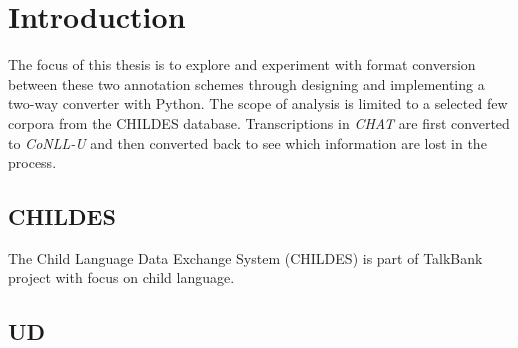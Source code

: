 \chapter{Introduction} %

\label{Chapter1} %


The focus of this thesis is to explore and experiment with format conversion between these two annotation schemes through designing and implementing a two-way converter with Python. The scope of analysis is limited to a selected few corpora from the CHILDES database. Transcriptions in \emph{CHAT} are first converted to \emph{CoNLL-U} and then converted back to see which information are lost in the process.


\section{CHILDES}

The Child Language Data Exchange System (CHILDES) is part of TalkBank project with focus on child language.

\section{UD}

